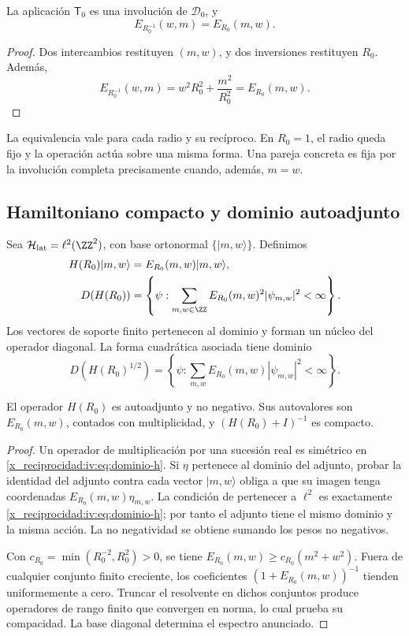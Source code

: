 \begin{theorem}
\label{x_reciprocidad:iv:thm:dualidad-escalar}
La aplicación \(\mathsf T_0\) es una involución de
\(\mathscr D_0\), y
\[
 E_{R_0^{-1}}(w,m)=E_{R_0}(m,w).
\]
\end{theorem}
\begin{proof}
Dos intercambios restituyen \((m,w)\), y dos inversiones restituyen
\(R_0\). Además,
\[
 E_{R_0^{-1}}(w,m)=w^2R_0^2+\frac{m^2}{R_0^2}
 =E_{R_0}(m,w).
\]
\end{proof}

La equivalencia vale para cada radio y su recíproco. En \(R_0=1\),
el radio queda fijo y la operación actúa sobre una misma forma.
Una pareja concreta es fija por la involución completa precisamente
cuando, además, \(m=w\).

\subsection{Hamiltoniano compacto y dominio autoadjunto}

Sea \(\mathcal H_{\mathrm{lat}}=\ell^2(\ZZ^2)\), con base
ortonormal \(\{|m,w\rangle\}\). Definimos
\begin{align}
 H(R_0)|m,w\rangle&=E_{R_0}(m,w)|m,w\rangle,\label{x_reciprocidad:iv:eq:hamiltoniano}\\
 D(H(R_0))&=\left\{\psi:\sum_{m,w\in\ZZ}
 E_{R_0}(m,w)^2|\psi_{m,w}|^2<\infty\right\}.\label{x_reciprocidad:iv:eq:dominio-h}
\end{align}
Los vectores de soporte finito pertenecen al dominio y forman un
núcleo del operador diagonal. La forma cuadrática asociada tiene
dominio
\[
 D(H(R_0)^{1/2})=\left\{\psi:\sum_{m,w}
 E_{R_0}(m,w)|\psi_{m,w}|^2<\infty\right\}.
\]

\begin{proposition}
\label{x_reciprocidad:iv:prop:h-autoadjunto}
El operador \(H(R_0)\) es autoadjunto y no negativo. Sus
autovalores son \(E_{R_0}(m,w)\), contados con multiplicidad,
y \((H(R_0)+I)^{-1}\) es compacto.
\end{proposition}
\begin{proof}
Un operador de multiplicación por una sucesión real es simétrico
en \eqref{x_reciprocidad:iv:eq:dominio-h}. Si \(\eta\) pertenece al dominio
del adjunto, probar la identidad del adjunto contra cada vector
\(|m,w\rangle\) obliga a que su imagen tenga coordenadas
\(E_{R_0}(m,w)\eta_{m,w}\). La condición de pertenecer a
\(\ell^2\) es exactamente \eqref{x_reciprocidad:iv:eq:dominio-h}; por tanto
el adjunto tiene el mismo dominio y la misma acción. La no
negatividad se obtiene sumando los pesos no negativos.

Con \(c_{R_0}=\min(R_0^{-2},R_0^2)>0\), se tiene
\(E_{R_0}(m,w)\geq c_{R_0}(m^2+w^2)\). Fuera de cualquier
conjunto finito creciente, los coeficientes
\((1+E_{R_0}(m,w))^{-1}\) tienden uniformemente a cero.
Truncar el resolvente en dichos conjuntos produce operadores
de rango finito que convergen en norma, lo cual prueba su
compacidad. La base diagonal determina el espectro anunciado.
\end{proof}

